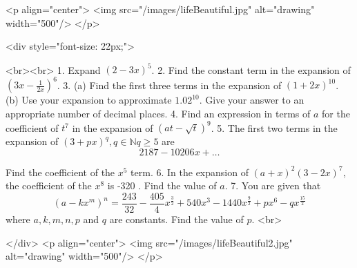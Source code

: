 <p align="center">
<img src="/images/lifeBeautiful.jpg" alt="drawing" width="500"/>
</p>

<div style="font-size: 22px;">

<br><br>
1. Expand $(2-3 x)^{5}$.
2. Find the constant term in the expansion of $\left(3 x-\frac{1}{2 x}\right)^{6}$.
3. (a) Find the first three terms in the expansion of $(1+2 x)^{10}$.
(b) Use your expansion to approximate $1.02^{10}$. Give your answer to an appropriate number of decimal places.
4. Find an expression in terms of $a$ for the coefficient of $t^{7}$ in the expansion of $(a t-\sqrt{t})^{9}$.
5. The first two terms in the expansion of $(3+p x)^{q}, q \in \mathbb{N} q \geq 5$ are
$$
2187-10206 x+\ldots
$$

Find the coefficient of the $x^{5}$ term.
6. In the expansion of $(a+x)^{2}(3-2 x)^{7}$, the coefficient of the $x^{8}$ is -320 . Find the value of $a$.
7. You are given that
$$
\left(a-k x^{m}\right)^{n}=\frac{243}{32}-\frac{405}{4} x^{\frac{3}{2}}+540 x^{3}-1440 x^{\frac{9}{2}}+p x^{6}-q x^{\frac{15}{2}}
$$
where $a, k, m, n, p$ and $q$ are constants.
Find the value of $p$.
<br>

</div>
<p align="center">
<img src="/images/lifeBeautiful2.jpg" alt="drawing" width="500"/>
</p>
